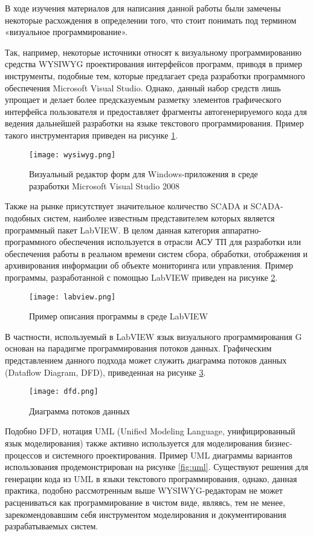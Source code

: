 В ходе изучения материалов для написания данной работы были замечены некоторые расхождения в определении того, что стоит понимать под термином «визуальное программирование». 

Так, например, некоторые источники относят к визуальному программированию средства WYSIWYG проектирования интерфейсов программ, приводя в пример инструменты, подобные тем, которые предлагает среда разработки программного обеспечения Microsoft Visual Studio. Однако, данный набор средств лишь упрощает и делает более предсказуемым разметку элементов графического интерфейса пользователя и предоставляет фрагменты автогенерируемого кода для ведения дальнейшей разработки на языке текстового программирования. Пример такого инструментария приведен на рисунке \ref{fig:wysiwyg}.

\begin{figure}[htbp]
	\centering
	\texttt{[image: wysiwyg.png]}
	\caption{Визуальный редактор форм для Windows-приложения в среде разработки Microsoft Visual Studio 2008}%
	\label{fig:wysiwyg}
\end{figure}

Также на рынке присутствует значительное количество SCADA и SCADA-подобных систем, наиболее известным представителем которых является программный пакет LabVIEW. В целом данная категория аппаратно-программного обеспечения используется в отрасли АСУ ТП для разработки или обеспечения работы в реальном времени систем сбора, обработки, отображения и архивирования информации об объекте мониторинга или управления. Пример программы, разработанной с помощью LabVIEW приведен на рисунке \ref{fig:labview}.

\begin{figure}[htbp]
	\centering
	\texttt{[image: labview.png]}
	\caption{Пример описания программы в среде LabVIEW}%
	\label{fig:labview}
\end{figure}

В частности, используемый в LabVIEW язык визуального программирования G основан на парадигме программирования потоков данных. Графическим представлением данного подхода может служить диаграмма потоков данных (Dataflow Diagram, DFD), приведенная на рисунке \ref{fig:dfd}.

\begin{figure}[htbp]
	\centering
	\texttt{[image: dfd.png]}
	\caption{Диаграмма потоков данных}%
	\label{fig:dfd}
\end{figure}

Подобно DFD, нотация UML (Unified Modeling Language, унифицированный язык моделирования) также активно используется для моделирования бизнес-процессов и системного проектирования. Пример UML диаграммы вариантов использования продемонстрирован на рисунке \ref{fig:uml}. Существуют решения \cite{uml} для генерации кода из UML в языки текстового программирования, однако, данная практика, подобно рассмотренным выше WYSIWYG-редакторам не может расцениваться как программирование в чистом виде, являясь, тем не менее, зарекомендовавшим себя инструментом моделирования и документирования разрабатываемых систем.

